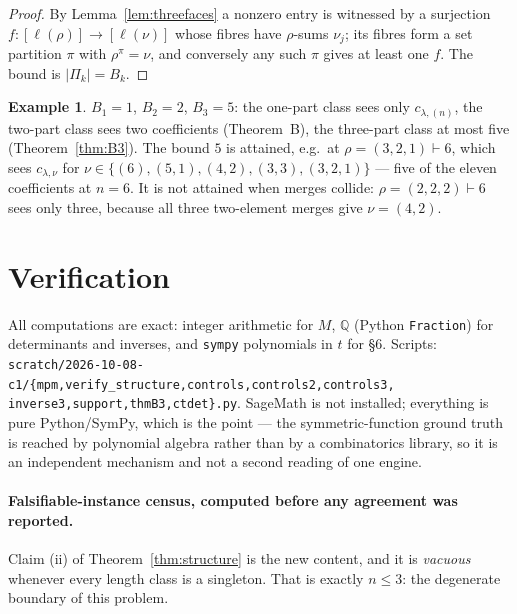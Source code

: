 \documentclass[11pt]{article}
\theoremstyle{definition}
\newtheorem{example}[theorem]{Example}
\newcommand{\lam}{\lambda}
\begin{document}
\begin{proof}
By Lemma~\ref{lem:threefaces} a nonzero entry is witnessed by a surjection
$f:[\ell(\rho)]\to[\ell(\nu)]$ whose fibres have $\rho$-sums $\nu_j$; its fibres form a set
partition $\pi$ with $\rho^\pi=\nu$, and conversely any such $\pi$ gives at least one $f$. The bound
is $|\Pi_k|=B_k$.
\end{proof}

\begin{example}
$B_1=1$, $B_2=2$, $B_3=5$: the one-part class sees only $c_{\lam,(n)}$, the two-part class sees two
coefficients (Theorem~B), the three-part class at most five (Theorem~\ref{thm:B3}). The bound $5$ is
attained, e.g.\ at $\rho=(3,2,1)\vdash6$, which sees
$c_{\lam,\nu}$ for $\nu\in\{(6),(5,1),(4,2),(3,3),(3,2,1)\}$ --- five of the eleven coefficients at
$n=6$. It is not attained when merges collide: $\rho=(2,2,2)\vdash6$ sees only three, because all
three two-element merges give $\nu=(4,2)$.
\end{example}

\section{Verification}\label{sec:verif}

All computations are exact: integer arithmetic for $M$, $\mathbb{Q}$ (Python
\texttt{Fraction}) for determinants and inverses, and \texttt{sympy} polynomials in $t$ for
\S6. Scripts: \texttt{scratch/2026-10-08-c1/\{mpm,verify\_structure,controls,controls2,controls3,%
inverse3,support,thmB3,ctdet\}.py}. SageMath is not installed; everything is pure Python/SymPy,
which is the point --- the symmetric-function ground truth is reached by polynomial algebra rather
than by a combinatorics library, so it is an independent mechanism and not a second reading of one
engine.

\paragraph{Falsifiable-instance census, computed before any agreement was reported.}
Claim (ii) of Theorem~\ref{thm:structure} is the new content, and it is \emph{vacuous} whenever
every length class is a singleton. That is exactly $n\le3$: the degenerate boundary of this problem.
\end{document}
